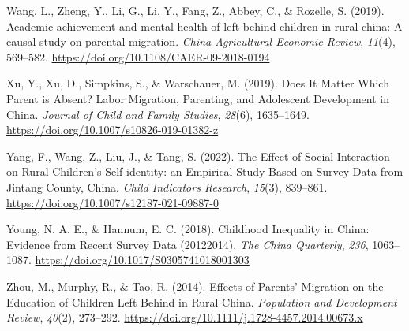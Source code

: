 \documentclass[
  man]{apa7}
\newlength{\cslhangindent}
\newlength{\cslentryspacingunit} %
\newenvironment{CSLReferences}[2] %
 {%
  \setlength{\parindent}{0pt}
  \ifodd #1
  \let\oldpar\par
  \def\par{\hangindent=\cslhangindent\oldpar}
  \fi
  \setlength{\parskip}{#2\cslentryspacingunit}
 }%
 {}
\begin{document}
\begin{CSLReferences}{1}{0}
\leavevmode{}%
Wang, L., Zheng, Y., Li, G., Li, Y., Fang, Z., Abbey, C., \& Rozelle, S. (2019). Academic achievement and mental health of left-behind children in rural china: A causal study on parental migration. \emph{China Agricultural Economic Review}, \emph{11}(4), 569--582. \url{https://doi.org/10.1108/CAER-09-2018-0194}

\leavevmode{}%
Xu, Y., Xu, D., Simpkins, S., \& Warschauer, M. (2019). Does It Matter Which Parent is Absent? Labor Migration, Parenting, and Adolescent Development in China. \emph{Journal of Child and Family Studies}, \emph{28}(6), 1635--1649. \url{https://doi.org/10.1007/s10826-019-01382-z}

\leavevmode{}%
Yang, F., Wang, Z., Liu, J., \& Tang, S. (2022). The Effect of Social Interaction on Rural Children{'}s Self-identity: an Empirical Study Based on Survey Data from Jintang County, China. \emph{Child Indicators Research}, \emph{15}(3), 839--861. \url{https://doi.org/10.1007/s12187-021-09887-0}

\leavevmode{}%
Young, N. A. E., \& Hannum, E. C. (2018). Childhood Inequality in China: Evidence from Recent Survey Data (2012{\textendash}2014). \emph{The China Quarterly}, \emph{236}, 1063--1087. \url{https://doi.org/10.1017/S0305741018001303}

\leavevmode{}%
Zhou, M., Murphy, R., \& Tao, R. (2014). Effects of Parents' Migration on the Education of Children Left Behind in Rural China. \emph{Population and Development Review}, \emph{40}(2), 273--292. \url{https://doi.org/10.1111/j.1728-4457.2014.00673.x}

\end{CSLReferences}
\end{document}
